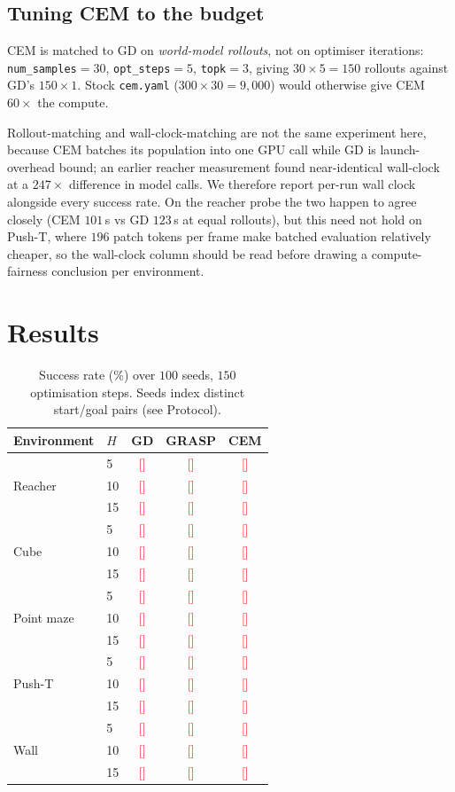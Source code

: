 \documentclass[11pt]{article}
\newcommand{\TODO}[1]{\textcolor{red}{[#1]}}
\begin{document}
\subsection{Tuning CEM to the budget}
\label{sec:cem}
CEM is matched to GD on \emph{world-model rollouts}, not on optimiser
iterations: \texttt{num\_samples}$=30$, \texttt{opt\_steps}$=5$,
\texttt{topk}$=3$, giving $30 \times 5 = 150$ rollouts against GD's
$150 \times 1$. Stock \texttt{cem.yaml} ($300 \times 30 = 9{,}000$) would
otherwise give CEM $60\times$ the compute.

Rollout-matching and wall-clock-matching are not the same experiment here,
because CEM batches its population into one GPU call while GD is
launch-overhead bound; an earlier reacher measurement found near-identical
wall-clock at a $247\times$ difference in model calls. We therefore report
per-run wall clock alongside every success rate. On the reacher probe the two
happen to agree closely (CEM $101$\,s vs GD $123$\,s at equal rollouts), but
this need not hold on Push-T, where $196$ patch tokens per frame make batched
evaluation relatively cheaper, so the wall-clock column should be read
before drawing a compute-fairness conclusion per environment.

\section{Results}

\begin{table}[h]
\centering
\begin{tabular}{llccc}
\toprule
Environment & $H$ & GD & GRASP & CEM \\
\midrule
\multirow{3}{*}{Reacher}
 & 5  & \TODO{} & \TODO{} & \TODO{} \\
 & 10 & \TODO{} & \TODO{} & \TODO{} \\
 & 15 & \TODO{} & \TODO{} & \TODO{} \\
\midrule
\multirow{3}{*}{Cube}
 & 5  & \TODO{} & \TODO{} & \TODO{} \\
 & 10 & \TODO{} & \TODO{} & \TODO{} \\
 & 15 & \TODO{} & \TODO{} & \TODO{} \\
\midrule
\multirow{3}{*}{Point maze}
 & 5  & \TODO{} & \TODO{} & \TODO{} \\
 & 10 & \TODO{} & \TODO{} & \TODO{} \\
 & 15 & \TODO{} & \TODO{} & \TODO{} \\
\midrule
\multirow{3}{*}{Push-T}
 & 5  & \TODO{} & \TODO{} & \TODO{} \\
 & 10 & \TODO{} & \TODO{} & \TODO{} \\
 & 15 & \TODO{} & \TODO{} & \TODO{} \\
\midrule
\multirow{3}{*}{Wall}
 & 5  & \TODO{} & \TODO{} & \TODO{} \\
 & 10 & \TODO{} & \TODO{} & \TODO{} \\
 & 15 & \TODO{} & \TODO{} & \TODO{} \\
\bottomrule
\end{tabular}
\caption{Success rate (\%) over $100$ seeds, $150$ optimisation steps.
Seeds index distinct start/goal pairs (see Protocol).}
\end{table}
\end{document}
